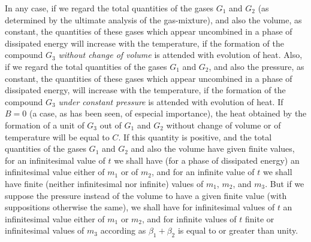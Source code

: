 \documentclass[12pt]{article}
\begin{document}
In any case, if we regard the total quantities of the gases $G_1$  and $G_2$ (as determined by the ultimate analysis of the gas-mixture), and also the volume, as constant, the quantities of these gases which appear uncombined in a phase of dissipated energy will increase with the temperature, if the formation of the compound $G_3$ \textit{without change of volume} is attended with evolution of heat.  Also, if we regard the total quantities of the gases $G_1$ and $G_2$, and also the pressure, as constant, the quantities of these gases which appear uncombined in a phase of dissipated energy, will increase with the temperature, if the formation of the compound $G_3$ \textit{under constant pressure} is attended with evolution of heat.  If $B=0$ (a case, as has been seen, of especial importance), the heat obtained by the formation of a unit of $G_3$ out of $G_1$  and $G_2$ without change of volume or of temperature will be equal to $C$. If this quantity is positive, and the total quantities of the gases $G_1$  and $G_2$ and also the volume have given finite values, for an infinitesimal value of $t$ we shall have (for a phase of dissipated energy) an infinitesimal value either of $m_1$ or of $m_2$, and for an infinite value of $t$ we shall have finite (neither infinitesimal nor infinite) values of $m_1$, $m_2$, and $m_3$. But if we suppose the pressure instead of the volume to have a given finite value (with suppositions otherwise the same), we shall have for infinitesimal values of $t$ an infinitesimal value either of $m_1$ or $m_2$, and for infinite values of $t$ finite or infinitesimal values of $m_3$ according as $\beta_1+\beta_2$ is equal to or greater than unity.
\end{document}
